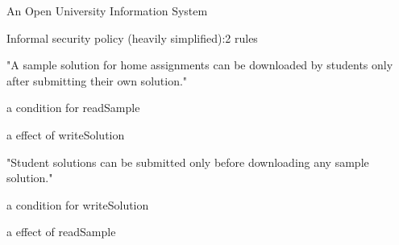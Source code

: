 \documentclass[a4paper]{article}
\begin{document}
\begin{multicols}{3}
    An Open University Information System
    \begin{itemize*}
        \item Informal security policy (heavily simplified):2 rules
              \begin{itemize*}
                  \item "A sample solution for home assignments can be downloaded by students only after submitting their own solution."
                        \begin{itemize*}
                            \item a condition for readSample
                            \item a effect of writeSolution
                        \end{itemize*}
                  \item "Student solutions can be submitted only before downloading any sample solution."
                        \begin{itemize*}
                            \item a condition for writeSolution
                            \item a effect of readSample
                        \end{itemize*}
              \end{itemize*}
    \end{itemize*}



\end{multicols}
\end{document}

